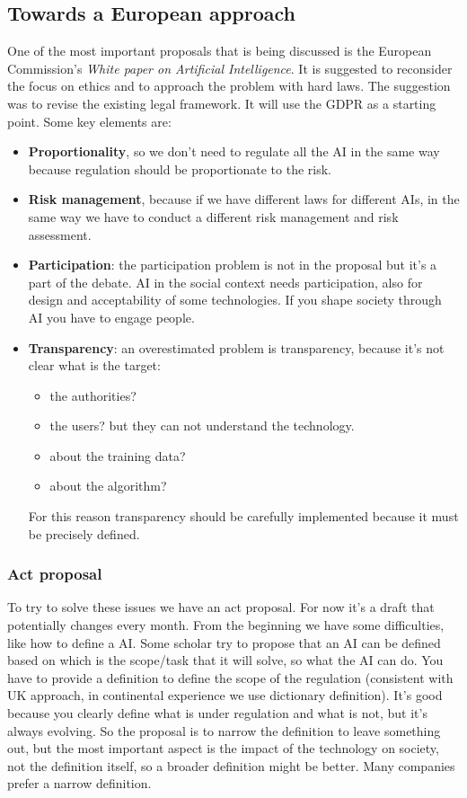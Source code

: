 \subsection{Towards a European approach}
One of the most important proposals that is being discussed is the European Commission's \textit{White paper on Artificial Intelligence}. It is suggested to reconsider the focus on ethics and to approach the problem with hard laws. The suggestion was to revise the existing legal framework. It will use the GDPR as a starting point.
Some key elements are: 
\begin{itemize}
    \item \textbf{Proportionality}, so we don't need to regulate all the AI in the same way because regulation should be proportionate to the risk.
    \item \textbf{Risk management}, because if we have different laws for different AIs, in the same way we have to conduct a different risk management and risk assessment.
    \item \textbf{Participation}: the participation problem is not in the proposal but it's a part of the debate. AI in the social context needs participation, also for design and acceptability of some technologies. If you shape society through AI you have to engage people.
    \item \textbf{Transparency}: an overestimated problem is transparency, because it's not clear what is the target:
    \begin{itemize}
        \item the authorities?
        \item the users? but they can not understand the technology.
        \item about the training data?
        \item about the algorithm?
    \end{itemize}
    For this reason transparency should be carefully implemented because it must be precisely defined.
\end{itemize}

\subsubsection{Act proposal}
To try to solve these issues we have an act proposal. For now it's a draft that potentially changes every month. From the beginning we have some difficulties, like how to define a AI. Some scholar try to propose that an AI can be defined based on which is the scope/task that it will solve, so what the AI can do. You have to provide a definition to define the scope of the regulation (consistent with UK approach, in continental experience we use dictionary definition). It's good because you clearly define what is under regulation and what is not, but it's always evolving. So the proposal is to narrow the definition to leave something out, but the most important aspect is the impact of the technology on society, not the definition itself, so a broader definition might be better. Many companies prefer a narrow definition.

